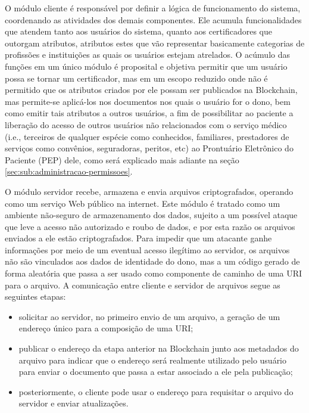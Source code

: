 \documentclass[a4paper,11pt]{article}
\begin{document}
O módulo cliente é responsável por definir a lógica de funcionamento do sistema, coordenando as atividades dos demais componentes.
Ele acumula funcionalidades que atendem tanto aos usuários do sistema, quanto aos certificadores que outorgam atributos, atributos estes que vão representar basicamente categorias de profissões e instituições as quais os usuários estejam atrelados.
O acúmulo das funções em um único módulo é proposital e objetiva permitir que um usuário possa se tornar um certificador, mas em um escopo reduzido onde não é permitido que os atributos criados por ele possam ser publicados na Blockchain, mas permite-se aplicá-los nos documentos nos quais o usuário for o dono, bem como emitir tais atributos a outros usuários, a fim de possibilitar ao paciente a liberação do acesso de outros usuários não relacionados com o serviço médico (i.e., terceiros de qualquer espécie como conhecidos, familiares, prestadores de serviços como convênios, seguradoras, peritos, etc) ao Prontuário Eletrônico do Paciente (PEP) dele, como será explicado mais adiante na seção \ref{sec:sub:administracao-permissoes}.

O módulo servidor recebe, armazena e envia arquivos criptografados, operando como um serviço Web público na internet.
Este módulo é tratado como um ambiente não-seguro de armazenamento dos dados, sujeito a um possível ataque que leve a acesso não autorizado e roubo de dados, e por esta razão os arquivos enviados a ele estão criptografados.
Para impedir que um atacante ganhe informações por meio de um eventual acesso ilegítimo ao servidor, os arquivos não são vinculados aos dados de identidade do dono, mas a um código gerado de forma aleatória que passa a ser usado como componente de caminho de uma URI para o arquivo.
A comunicação entre cliente e servidor de arquivos segue as seguintes etapas:
\begin{itemize}
  \item solicitar ao servidor, no primeiro envio de um arquivo, a geração de um endereço único para a composição de uma URI;
  \item publicar o endereço da etapa anterior na Blockchain junto aos metadados do arquivo para indicar que o endereço será realmente utilizado pelo usuário para enviar o documento que passa a estar associado a ele pela publicação;
  \item posteriormente, o cliente pode usar o endereço para requisitar o arquivo do servidor e enviar atualizações.
\end{itemize}
\end{document}
